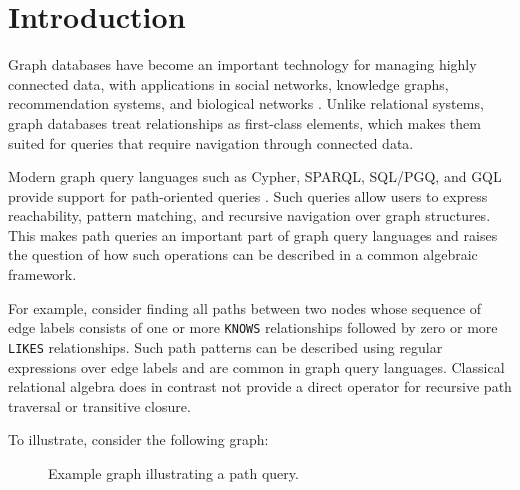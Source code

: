 \section{Introduction}

Graph databases have become an important technology for managing highly connected data, with applications in social networks, knowledge graphs, recommendation systems, and biological networks \cite{angles2017foundations,bonifati2018querying}. Unlike relational systems, graph databases treat relationships as first-class elements, which makes them suited for queries that require navigation through connected data.

Modern graph query languages such as Cypher, SPARQL, SQL/PGQ, and GQL provide support for path-oriented queries \cite{angles2017foundations}. Such queries allow users to express reachability, pattern matching, and recursive navigation over graph structures. This makes path queries an important part of graph query languages and raises the question of how such operations can be described in a common algebraic framework.


For example, consider finding all paths between two nodes whose sequence of edge labels consists of one or more \texttt{KNOWS} relationships followed by zero or more \texttt{LIKES} relationships. Such path patterns can be described using regular expressions over edge labels and are common in graph query languages. Classical relational algebra does in contrast not provide a direct operator for recursive path traversal or transitive closure.

To illustrate, consider the following graph:

\begin{figure}[h!]
  \centering
  \caption{Example graph illustrating a path query.}
\end{figure}

